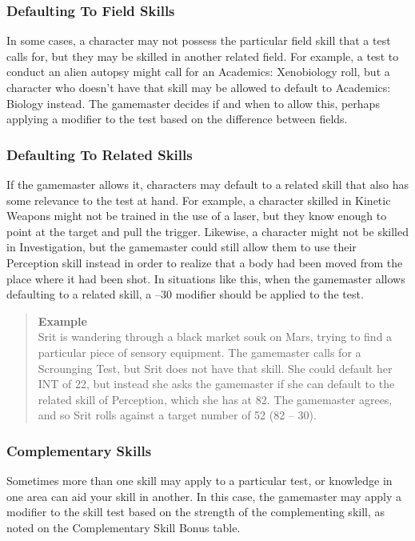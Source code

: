  \subsubsection{Defaulting To Field Skills}
In some cases, a character may not possess the particular field skill that a test calls for, but they may be
skilled in another related field. For example, a test to
conduct an alien autopsy might call for an Academics:
Xenobiology roll, but a character who doesn’t have
that skill may be allowed to default to Academics:
Biology instead. The gamemaster decides if and when
to allow this, perhaps applying a modifier to the test
based on the difference between fields.


 \subsubsection{Defaulting To Related Skills}
If the gamemaster allows it, characters may default to
a related skill that also has some relevance to the test
at hand. For example, a character skilled in Kinetic
Weapons might not be trained in the use of a laser, but
they know enough to point at the target and pull the
trigger. Likewise, a character might not be skilled in
Investigation, but the gamemaster could still allow
them to use their Perception skill instead in order to
realize that a body had been moved from the place
where it had been shot. In situations like this, when the
gamemaster allows defaulting to a related skill, a –30
modifier should be applied to the test.

\begin{quotation}
\textbf{Example}
\\
Srit is wandering through a black market souk on
Mars, trying to find a particular piece of sensory
equipment. The gamemaster calls for a Scrounging
Test, but Srit does not have that skill. She could
default her INT of 22, but instead she asks the
gamemaster if she can default to the related skill
of Perception, which she has at 82. The gamemaster agrees, and so Srit rolls against a target number
of 52 (82 – 30).
\end{quotation}




\subsubsection{Complementary Skills}
 Sometimes more than one skill may apply to a particular test, or knowledge in one area can aid your skill
 in another. In this case, the gamemaster may apply a
 modifier to the skill test based on the strength of the
 complementing skill, as noted on the Complementary
 Skill Bonus table.


